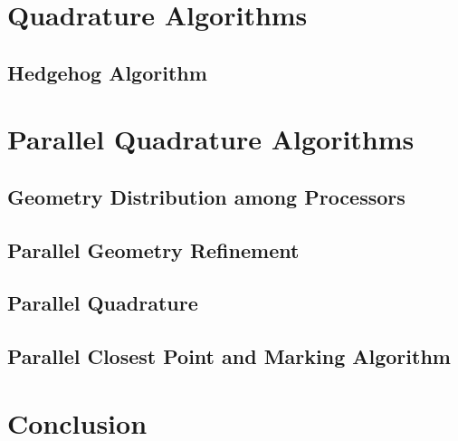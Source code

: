 \section{Quadrature Algorithms}
\subsection{Hedgehog Algorithm}

\section{Parallel Quadrature Algorithms}
\subsection{Geometry Distribution among Processors}
\subsection{Parallel Geometry Refinement}
\subsection{Parallel Quadrature}
\subsection{Parallel Closest Point and Marking Algorithm}




\section{Conclusion}
